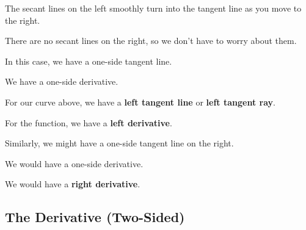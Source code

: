 \documentclass{ximera}
\begin{document}
The secant lines on the left smoothly turn into the tangent line as you move to the right. 


There are no secant lines on the right, so we don't have to worry about them. 





In this case, we have a one-side tangent line.  

We have a one-side derivative. 


For our curve above, we have a \textbf{left tangent line} or \textbf{left tangent ray}.

For the function, we have a \textbf{left derivative}.













Similarly, we might have a one-side tangent line on the right.  

We would have a one-side derivative. 


We would have a \textbf{right derivative}.






\subsection*{The Derivative (Two-Sided)}
\end{document}
